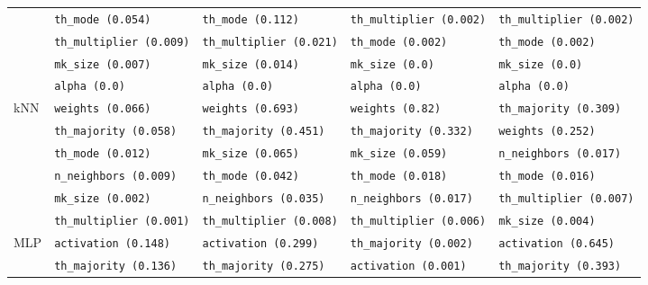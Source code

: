 \begin{table}[h]
\begin{adjustwidth}{-3.5cm}{}
\begin{tabular}{lllll}
                  & \texttt{th\_mode (0.054)}             & \texttt{th\_mode (0.112)}             & \texttt{th\_multiplier (0.002)}     & \texttt{th\_multiplier (0.002)}       \\
                  & \texttt{th\_multiplier (0.009)}       & \texttt{th\_multiplier (0.021)}       & \texttt{th\_mode (0.002)}           & \texttt{th\_mode (0.002)}             \\
                  & \texttt{mk\_size (0.007)}             & \texttt{mk\_size (0.014)}             & \texttt{mk\_size (0.0)}             & \texttt{mk\_size (0.0)}               \\
                  & \texttt{alpha (0.0)}                  & \texttt{alpha (0.0)}                  & \texttt{alpha (0.0)}                & \texttt{alpha (0.0)}                  \\
        kNN       & \texttt{weights (0.066)}              & \texttt{weights (0.693)}              & \texttt{weights (0.82)}             & \texttt{th\_majority (0.309)}         \\
                  & \texttt{th\_majority (0.058)}         & \texttt{th\_majority (0.451)}         & \texttt{th\_majority (0.332)}       & \texttt{weights (0.252)}              \\
                  & \texttt{th\_mode (0.012)}             & \texttt{mk\_size (0.065)}             & \texttt{mk\_size (0.059)}           & \texttt{n\_neighbors (0.017)}         \\
                  & \texttt{n\_neighbors (0.009)}         & \texttt{th\_mode (0.042)}             & \texttt{th\_mode (0.018)}           & \texttt{th\_mode (0.016)}             \\
                  & \texttt{mk\_size (0.002)}             & \texttt{n\_neighbors (0.035)}         & \texttt{n\_neighbors (0.017)}       & \texttt{th\_multiplier (0.007)}       \\
                  & \texttt{th\_multiplier (0.001)}       & \texttt{th\_multiplier (0.008)}       & \texttt{th\_multiplier (0.006)}     & \texttt{mk\_size (0.004)}             \\
        MLP       & \texttt{activation (0.148)}           & \texttt{activation (0.299)}           & \texttt{th\_majority (0.002)}       & \texttt{activation (0.645)}           \\
                  & \texttt{th\_majority (0.136)}         & \texttt{th\_majority (0.275)}         & \texttt{activation (0.001)}         & \texttt{th\_majority (0.393)}         \\

\end{tabular}
\end{adjustwidth}
\end{table}
